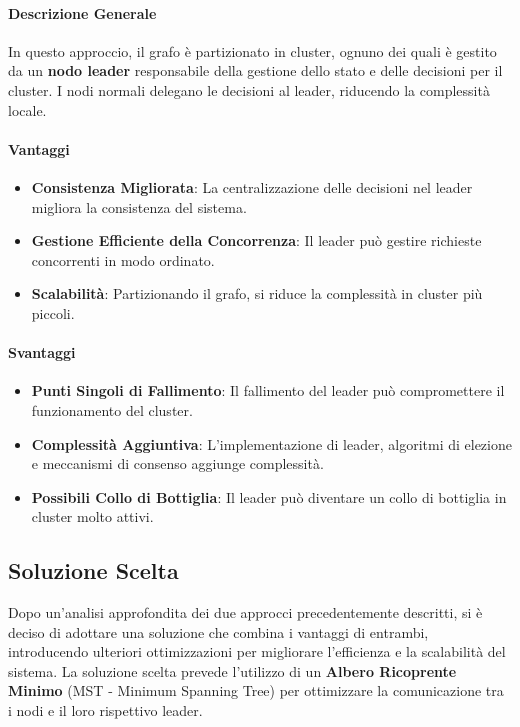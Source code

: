 \documentclass[12pt, a4paper]{report}
\begin{document}
\paragraph{Descrizione Generale}

In questo approccio, il grafo è partizionato in cluster, ognuno dei quali è gestito da un \textbf{nodo leader} responsabile della gestione dello stato e delle decisioni per il cluster. I nodi normali delegano le decisioni al leader, riducendo la complessità locale.

\paragraph{Vantaggi}

\begin{itemize}
    \item \textbf{Consistenza Migliorata}: La centralizzazione delle decisioni nel leader migliora la consistenza del sistema.
    \item \textbf{Gestione Efficiente della Concorrenza}: Il leader può gestire richieste concorrenti in modo ordinato.
    \item \textbf{Scalabilità}: Partizionando il grafo, si riduce la complessità in cluster più piccoli.
\end{itemize}

\paragraph{Svantaggi}

\begin{itemize}
    \item \textbf{Punti Singoli di Fallimento}: Il fallimento del leader può compromettere il funzionamento del cluster.
    \item \textbf{Complessità Aggiuntiva}: L'implementazione di leader, algoritmi di elezione e meccanismi di consenso aggiunge complessità.
    \item \textbf{Possibili Collo di Bottiglia}: Il leader può diventare un collo di bottiglia in cluster molto attivi.
\end{itemize}

\subsection{Soluzione Scelta}

Dopo un'analisi approfondita dei due approcci precedentemente descritti, si è deciso di adottare una soluzione che combina i vantaggi di entrambi, introducendo ulteriori ottimizzazioni per migliorare l'efficienza e la scalabilità del sistema. La soluzione scelta prevede l'utilizzo di un \textbf{Albero Ricoprente Minimo} (MST - Minimum Spanning Tree) per ottimizzare la comunicazione tra i nodi e il loro rispettivo leader.
\end{document}
